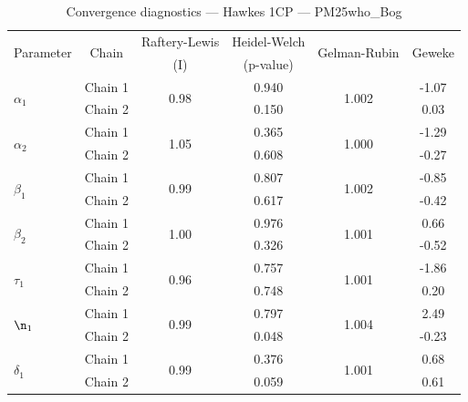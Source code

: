 \begin{table}[H]
\centering
\caption{Convergence diagnostics — Hawkes 1CP — PM25who_Bog}
\begin{tabular}{lccccc}
\toprule
\multirow{2}{*}{Parameter} & \multirow{2}{*}{Chain} & Raftery-Lewis & Heidel-Welch & \multirow{2}{*}{Gelman-Rubin} & \multirow{2}{*}{Geweke} \\
 & & (I) & (p-value) & & (z) \\
\midrule
\multirow{2}{*}{$\alpha_1$} & Chain 1 & \multirow{2}{*}{0.98} & 0.940 & \multirow{2}{*}{1.002} & -1.07 \\
 & Chain 2 & & 0.150 & & 0.03 \\
\multirow{2}{*}{$\alpha_2$} & Chain 1 & \multirow{2}{*}{1.05} & 0.365 & \multirow{2}{*}{1.000} & -1.29 \\
 & Chain 2 & & 0.608 & & -0.27 \\
\midrule
\multirow{2}{*}{$\beta_1$} & Chain 1 & \multirow{2}{*}{0.99} & 0.807 & \multirow{2}{*}{1.002} & -0.85 \\
 & Chain 2 & & 0.617 & & -0.42 \\
\multirow{2}{*}{$\beta_2$} & Chain 1 & \multirow{2}{*}{1.00} & 0.976 & \multirow{2}{*}{1.001} & 0.66 \\
 & Chain 2 & & 0.326 & & -0.52 \\
\midrule
\multirow{2}{*}{$\tau_1$} & Chain 1 & \multirow{2}{*}{0.96} & 0.757 & \multirow{2}{*}{1.001} & -1.86 \\
 & Chain 2 & & 0.748 & & 0.20 \\
\midrule
\multirow{2}{*}{$\n_1$} & Chain 1 & \multirow{2}{*}{0.99} & 0.797 & \multirow{2}{*}{1.004} & 2.49 \\
 & Chain 2 & & 0.048 & & -0.23 \\
\midrule
\multirow{2}{*}{$\delta_1$} & Chain 1 & \multirow{2}{*}{0.99} & 0.376 & \multirow{2}{*}{1.001} & 0.68 \\
 & Chain 2 & & 0.059 & & 0.61 \\
\bottomrule
\end{tabular}
\end{table}
